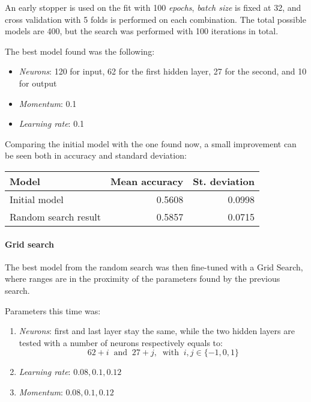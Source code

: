 An early stopper is used on the fit with 100 \emph{epochs}, \emph{batch size} 
is fixed at 
32, and cross validation with 5 folds is performed on each combination.
The total possible models are 400, but the search was performed with 100 iterations
in total.

The best model found was the following: 
\begin{itemize}
    \item \emph{Neurons}: 120 for input, 62 for the first hidden layer, 27 for the second, and 10 for output 
    \item \emph{Momentum}: 0.1
    \item \emph{Learning rate}: 0.1
\end{itemize}
Comparing the initial model with the one found now, a small improvement 
can be seen both in accuracy and standard deviation:
\begin{center}
    \begin{tabular}{ |l|r|r| } 
        \hline
        Model & Mean accuracy & St. deviation \\
        \hline
        Initial model & 0.5608& 0.0998\\
        Random search result & 0.5857 & 0.0715 \\
        \hline
    \end{tabular}
\end{center}

\paragraph{Grid search}
The best model from the random search was then fine-tuned with a Grid Search, 
where ranges are in the proximity of the parameters found by the previous search.

Parameters this time was:
\begin{enumerate}
    \item \emph{Neurons}: first and last layer stay the same, while 
    the two hidden layers are tested with a number of neurons respectively 
    equals to: 
    $$62 + i\;\;\text{and}\;\;27 + j,\;\;\text{with}\;\; i, j \in \{-1,0,1\}$$
    \item \emph{Learning rate}: $0.08, 0.1, 0.12$
    \item \emph{Momentum}: $0.08, 0.1, 0.12$
\end{enumerate}

